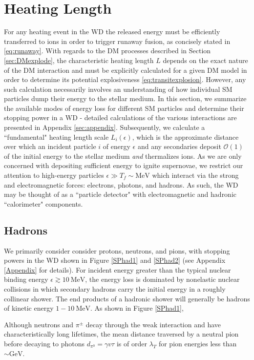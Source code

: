 \documentclass[twocolumn,showpacs,preprintnumbers,amsmath,amssymb,prd]{revtex4}
\newcommand{\OO}{\mathcal{O}}
\begin{document}
\section{Heating Length}
\label{sec:HeatingLength}
For any heating event in the WD the released energy must be efficiently transferred to ions in order to trigger runaway fusion, as concisely stated in \eqref{eq:runaway}. With regards to the DM processes described in Section \ref{sec:DMexplode}, the characteristic heating length $L$ depends on the exact nature of the DM interaction and must be explicitly calculated for a given DM model in order to determine its potential explosiveness \eqref{eq:transitexplosion}. However, any such calculation necessarily involves an understanding of how individual SM particles dump their energy to the stellar medium. In this section, we summarize the available modes of energy loss for different SM particles and determine their stopping power in a WD - detailed calculations of the various interactions are presented in Appendix \ref{sec:appendix}. Subsequently, we calculate a ``fundamental" heating length scale $L_i(\epsilon)$, which is the approximate distance over which an incident particle $i$ of energy $\epsilon$ and any secondaries deposit $\OO(1)$ of the initial energy to the stellar medium \emph{and} thermalizes ions. As we are only concerned with depositing sufficient energy to ignite supernovae, we restrict our attention to high-energy particles $\epsilon \gg T_f \sim \text{MeV}$ which interact via the strong and electromagnetic forces: electrons, photons, and hadrons. As such, the WD may be thought of as a ``particle detector" with electromagnetic and hadronic ``calorimeter" components.

\subsection{Hadrons}
We primarily consider consider protons, neutrons, and pions, with stopping powers in the WD shown in Figure \ref{SPhad1} and \ref{SPhad2} (see Appendix \ref{Appendix} for details). For incident energy greater than the typical nuclear binding energy $\epsilon \gtrsim 10 ~\text{MeV}$, the energy loss is dominated by nonelastic nuclear collisions in which secondary hadrons carry the initial energy in a roughly collinear shower. The end products of a hadronic shower will generally be hadrons of kinetic energy $1-10 ~\text{MeV}$. As shown in Figure \ref{SPhad1}, 


Although neutrons and $\pi^\pm$ decay through the weak interaction and have characteristically long lifetimes, the mean distance traversed by a neutral pion before decaying to photons $d_{\pi^0} = \gamma v \tau$ is of order $\lambda_T$ for pion energies less than $\sim \text{GeV}$. 
\end{document}
